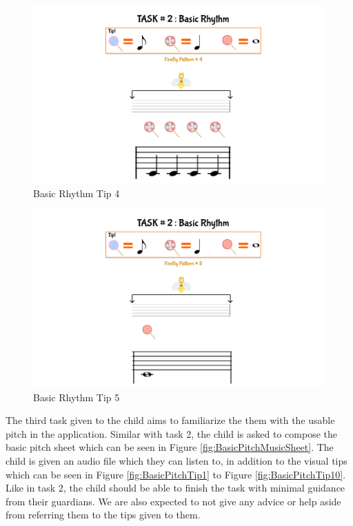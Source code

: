 \begin{figure}[H]
    \centering
    \includegraphics[width=15cm]{figures/NewFigures/BasicRhythmTip4.png}
    \caption{Basic Rhythm Tip 4}
    \label{fig:BasicRhythmTip4}
\end{figure}

\begin{figure}[H]
    \centering
    \includegraphics[width=15cm]{figures/NewFigures/BasicRhythmTip5.png}
    \caption{Basic Rhythm Tip 5}
    \label{fig:BasicRhythmTip5}
\end{figure}

The third task given to the child aims to familiarize the them with the usable pitch in the application. Similar with task 2, the child is asked to compose the basic pitch sheet which can be seen in Figure \ref{fig:BasicPitchMusicSheet}. The child is given an audio file which they can listen to, in addition to the visual tips which can be seen in Figure \ref{fig:BasicPitchTip1} to Figure \ref{fig:BasicPitchTip10}. Like in task 2, the child should be able to finish the task with minimal guidance from their guardians. We are also expected to not give any advice or help aside from referring them to the tips given to them.

